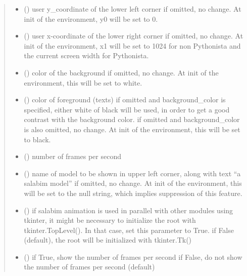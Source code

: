 \documentclass[letterpaper,10pt,english]{sphinxmanual}
\begin{document}
\begin{fulllineitems}
\begin{fulllineitems}
\begin{quote}
\begin{description}
\begin{itemize}
\item {} 
 () \textendash{} user y\_coordinate of the lower left corner 
if omitted, no change. At init of the environment, y0 will be set to 0.

\item {} 
 () \textendash{} user x-coordinate of the lower right corner 
if omitted, no change. At init of the environment, x1 will be set to 1024
for non Pythonista and the current screen width for Pythonista.

\item {} 
 () \textendash{} color of the background 
if omitted, no change. At init of the environment, this will be set to white.

\item {} 
 () \textendash{} color of foreground (texts) 
if omitted and background\_color is specified, either white of black will be used,
in order to get a good contrast with the background color. 
if omitted and background\_color is also omitted, no change. At init of the
environment, this will be set to black.

\item {} 
 () \textendash{} number of frames per second

\item {} 
 () \textendash{} name of model to be shown in upper left corner,
along with text “a salabim model” 
if omitted, no change. At init of the environment, this will be set
to the null string, which implies suppression of this feature.

\item {} 
 () \textendash{} if salabim animation is used in parallel with
other modules using tkinter, it might be necessary to
initialize the root with tkinter.TopLevel().
In that case, set this parameter to True. 
if False (default), the root will be initialized with tkinter.Tk()

\item {} 
 () \textendash{} if True, show the number of frames per second 
if False, do not show the number of frames per second (default)


\end{itemize}
\end{description}
\end{quote}
\end{fulllineitems}
\end{fulllineitems}
\end{document}
